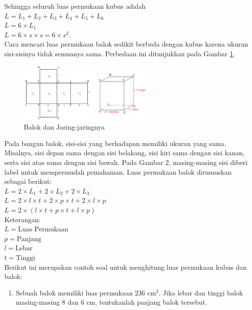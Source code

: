 \documentclass[12pt]{article}
\begin{document}
\begin{enumerate}
\begin{enumerate}
        Sehingga seluruh luas permukaan kubus adalah\\
        $ L = L_1 + L_2 + L_3 + L_4 + L_5 + L_6 $\\
        $ L = 6 \times L_1 $\\
        $ L = 6 \times s \times s = 6 \times s^2 .$\\
        Cara mencari luas permukaan balok sedikit berbeda dengan kubus karena ukuran sisi-sisinya tidak semuanya sama. Perbedaan ini ditunjukkan pada Gambar \ref{balokjaring}.
        \begin{figure}[H]
            \centering
            \includegraphics[width=0.6\textwidth]{images/balokdanjaring.png}
            \caption{Balok dan Jaring-jaringnya}
            \label{balokjaring}
        \end{figure}
        \hspace*{1cm}Pada bangun balok, sisi-sisi yang berhadapan memiliki ukuran yang sama. Misalnya, sisi depan sama dengan sisi belakang, sisi kiri sama dengan sisi kanan, serta sisi atas sama dengan sisi bawah. Pada Gambar 2, masing-masing sisi diberi label untuk mempermudah pemahaman. Luas permukaan balok dirumuskan sebagai berikut:\\
        $ L = 2 \times L_1 + 2 \times L_2 + 2 \times L_3 $\\
        $ L = 2 \times l \times t + 2 \times p \times t + 2 \times l \times p $\\
        $ L = 2 \times (l \times t + p \times t + l \times p) $\\
        Keterangan:\\
        $ L = \text{Luas Permukaan} $\\
        $ p = \text{Panjang} $\\
        $ l = \text{Lebar} $\\
        $ t = \text{Tinggi} $\\
        Berikut ini merupakan contoh soal untuk menghitung luas permukaan kubus dan balok:
        \begin{enumerate}[label=\arabic*)]
            \item Sebuah balok memiliki luas permukaan \( 236 \text{~cm}^2 \). Jika lebar dan tinggi balok masing-masing 8 dan 6 cm, tentukanlah panjang balok tersebut.\\

\end{enumerate}
\end{enumerate}
\end{enumerate}
\end{document}

